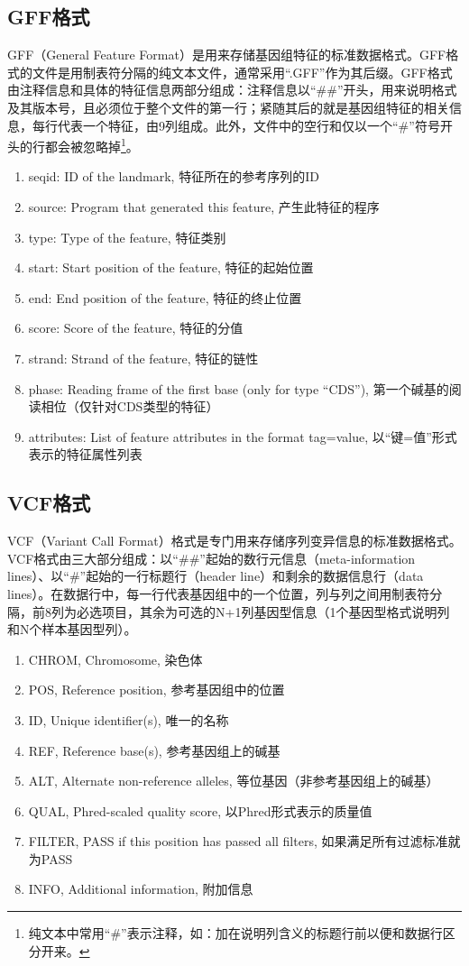 \documentclass[11pt,a4paper,twoside]{book}
\begin{document}
\subsection{GFF格式}
GFF（General Feature Format）是用来存储基因组特征的标准数据格式。GFF格式的文件是用制表符分隔的纯文本文件，通常采用“.GFF”作为其后缀。GFF格式由注释信息和具体的特征信息两部分组成：注释信息以“\#\#”开头，用来说明格式及其版本号，且必须位于整个文件的第一行；紧随其后的就是基因组特征的相关信息，每行代表一个特征，由9列组成。此外，文件中的空行和仅以一个“\#”符号开头的行都会被忽略掉\footnote{纯文本中常用“\#”表示注释，如：加在说明列含义的标题行前以便和数据行区分开来。}。
\begin{enumerate}
  \item seqid: ID of the landmark, 特征所在的参考序列的ID
  \item source: Program that generated this feature, 产生此特征的程序
  \item type: Type of the feature, 特征类别
  \item start: Start position of the feature, 特征的起始位置
  \item end: End position of the feature, 特征的终止位置
  \item score: Score of the feature, 特征的分值
  \item strand: Strand of the feature, 特征的链性
  \item phase: Reading frame of the first base (only for type ``CDS''), 第一个碱基的阅读相位（仅针对CDS类型的特征）
  \item attributes: List of feature attributes in the format tag=value, 以“键=值”形式表示的特征属性列表
\end{enumerate}

\subsection{VCF格式}
VCF（Variant Call Format）格式是专门用来存储序列变异信息的标准数据格式。VCF格式由三大部分组成：以“\#\#”起始的数行元信息（meta-information lines）、以“\#”起始的一行标题行（header line）和剩余的数据信息行（data lines）。在数据行中，每一行代表基因组中的一个位置，列与列之间用制表符分隔，前8列为必选项目，其余为可选的N+1列基因型信息（1个基因型格式说明列和N个样本基因型列）。
\begin{enumerate}
  \item CHROM, Chromosome, 染色体
  \item POS, Reference position, 参考基因组中的位置
  \item ID, Unique identifier(s), 唯一的名称
  \item REF, Reference base(s), 参考基因组上的碱基
  \item ALT, Alternate non-reference alleles, 等位基因（非参考基因组上的碱基）
  \item QUAL, Phred-scaled quality score, 以Phred形式表示的质量值
  \item FILTER, PASS if this position has passed all filters, 如果满足所有过滤标准就为PASS
  \item INFO, Additional information, 附加信息
\end{enumerate}
\end{document}
